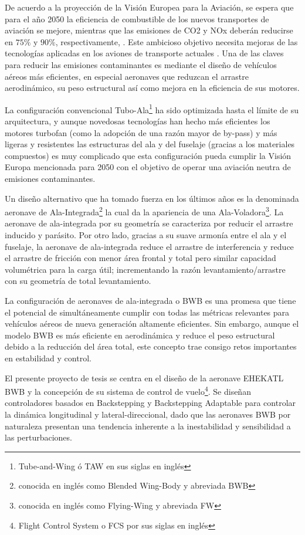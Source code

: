De acuerdo a la proyección de la Visión Europea para la Aviación, se espera que para el año 2050 la eficiencia de combustible de los nuevos transportes de aviación se mejore, mientras que las emisiones de CO2 y NOx deberán reducirse en $75 \%$ y $90 \%$, respectivamente, \cite{EU2011}. Este ambicioso objetivo necesita mejoras de las tecnologías aplicadas en los aviones de transporte actuales \cite{Chen2015}.
%
Una de las claves para reducir las emisiones contaminantes es mediante el diseño de vehículos aéreos más eficientes, en especial aeronaves que reduzcan el arrastre aerodinámico, su peso estructural así como mejora en la eficiencia de sus motores. 

La configuración convencional Tubo-Ala\footnote{Tube-and-Wing ó TAW  en sus siglas en inglés} ha sido optimizada hasta el límite de su arquitectura, y aunque novedosas tecnologías han hecho más eficientes los motores turbofan (como la adopción de una razón mayor de by-pass) y más ligeras y resistentes las estructuras del ala y del fuselaje (gracias a los materiales compuestos) es muy complicado que esta configuración pueda cumplir la Visión Europa mencionada para 2050 con el objetivo de operar una aviación neutra de emisiones contaminantes.


Un diseño alternativo que ha tomado fuerza en los últimos años es la denominada aeronave de Ala-Integrada\footnote{conocida en inglés como Blended Wing-Body y abreviada BWB} la cual da la apariencia de una  Ala-Voladora\footnote{conocida en inglés como Flying-Wing y abreviada FW}.
%
La aeronave de ala-integrada por su geometría se caracteriza por reducir el arrastre inducido y parásito.
Por otro lado, gracias a su suave armonía entre el ala y el fuselaje, la aeronave de ala-integrada reduce el arrastre de interferencia y reduce el arrastre de fricción con menor área frontal y total pero similar capacidad volumétrica para la carga útil; incrementando la razón levantamiento/arrastre con su geometría de total levantamiento. 

La configuración de aeronaves de ala-integrada o BWB es una promesa que tiene el potencial de simultáneamente cumplir con todas las métricas relevantes para vehículos aéreos de nueva generación altamente eficientes. Sin embargo, aunque el modelo BWB es más eficiente en aerodinámica y reduce el peso estructural debido a la reducción del área total, este concepto trae consigo retos importantes en estabilidad y control. 

El presente proyecto de tesis se centra en el diseño de la aeronave EHEKATL BWB y la concepción de su sistema de control de vuelo\footnote{Flight Control System o FCS por sus siglas en inglés}. Se diseñan controladores basados en Backstepping y Backstepping Adaptable para controlar la dinámica longitudinal y lateral-direccional, dado que las aeronaves BWB por naturaleza presentan una tendencia inherente a la inestabilidad y sensibilidad a las perturbaciones.

